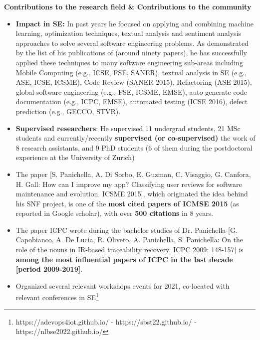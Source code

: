 \documentclass[11pt]{article}
\begin{document}
\textbf{Contributions to the research field \& Contributions to the community}
\vspace{-2.5mm}
\begin{itemize}
\item \textbf{Impact in SE:} In past years he focused on applying and combining machine learning, optimization techniques, textual analysis and sentiment analysis approaches to solve several software engineering problems. As demonstrated by the list of his publications of (around ninety papers), he has successfully applied these techniques to many software engineering sub-areas including Mobile Computing (e.g., ICSE, FSE, SANER), textual analysis in SE (e.g., ASE, ICSE, ICSME), Code Review (SANER 2015), Refactoring (ASE 2015), global software engineering (e.g., FSE, ICSME, EMSE), auto-generate code documentation (e.g., ICPC, EMSE), automated testing (ICSE 2016), defect prediction (e.g., GECCO, STVR). 
  \vspace{-2mm}
  \item 
  \textbf{Supervised researchers}: He supervised 11 undergrad students, 21 MSc students and currently/recently \textbf{supervised (or co-supervised)} the work of 8 research assistants, and 9 PhD students (6 of them during the postdoctoral experience at the University of Zurich)
  \vspace{-2mm} 
 \item The paper [S. Panichella, A. Di Sorbo, E. Guzman, C. Visaggio, G. Canfora, H. Gall: How can I improve my app? Classifying user reviews for software maintenance and evolution. ICSME 2015], which originated the idea behind his SNF project, is one of the \textbf{most cited papers of ICMSE 2015} (as reported in Google scholar), with over \textbf{500 citations} in 8 years.   
 \vspace{-2mm}
  \item The paper ICPC wrote during the bachelor studies of Dr. Panichella-[G. Capobianco, A. De Lucia, R. Oliveto, A. Panichella, S. Panichella: On the role of the nouns in IR-based traceability recovery. ICPC 2009: 148-157] is \textbf{among the most influential papers of ICPC in the last decade [period 2009-2019]}.
  \vspace{-2mm}
 \item Organized several relevant workshops events for 2021, co-located with relevant conferences in SE\footnote{https://adevops4iot.github.io/
-	https://sbst22.github.io/
-	https://nlbse2022.github.io/}
  \vspace{-2mm}
\end{itemize}
\end{document}

